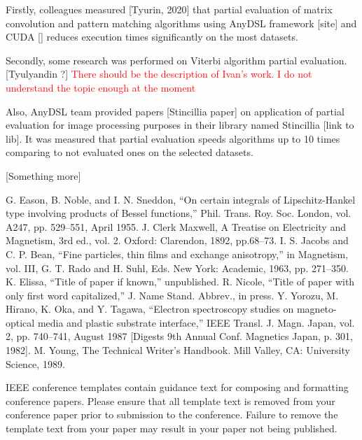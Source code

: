 \documentclass[conference]{IEEEtran}
\begin{document}
Firstly, colleagues measured [Tyurin, 2020] that partial evaluation of matrix convolution and pattern matching algorithms using AnyDSL framework [site] and CUDA [] reduces execution times significantly on the most datasets.

Secondly, some research was performed on Viterbi algorithm partial evaluation. [Tyulyandin ?] \textcolor{red}{There should be the description of Ivan's work. I do not understand the topic enough at the moment}

Also, AnyDSL team provided papers [Stincillia paper] on application of partial evaluation for image processing purposes in their library named Stincillia [link to lib]. It was measured that partial evaluation speeds algorithms up to 10 times comparing to not evaluated ones on the selected datasets.

[Something more]


\begin{thebibliography}{00}
 G. Eason, B. Noble, and I. N. Sneddon, ``On certain integrals of Lipschitz-Hankel type involving products of Bessel functions,'' Phil. Trans. Roy. Soc. London, vol. A247, pp. 529--551, April 1955.
 J. Clerk Maxwell, A Treatise on Electricity and Magnetism, 3rd ed., vol. 2. Oxford: Clarendon, 1892, pp.68--73.
 I. S. Jacobs and C. P. Bean, ``Fine particles, thin films and exchange anisotropy,'' in Magnetism, vol. III, G. T. Rado and H. Suhl, Eds. New York: Academic, 1963, pp. 271--350.
 K. Elissa, ``Title of paper if known,'' unpublished.
 R. Nicole, ``Title of paper with only first word capitalized,'' J. Name Stand. Abbrev., in press.
 Y. Yorozu, M. Hirano, K. Oka, and Y. Tagawa, ``Electron spectroscopy studies on magneto-optical media and plastic substrate interface,'' IEEE Transl. J. Magn. Japan, vol. 2, pp. 740--741, August 1987 [Digests 9th Annual Conf. Magnetics Japan, p. 301, 1982].
 M. Young, The Technical Writer's Handbook. Mill Valley, CA: University Science, 1989.
\end{thebibliography}
\vspace{12pt}
\color{red}
IEEE conference templates contain guidance text for composing and formatting conference papers. Please ensure that all template text is removed from your conference paper prior to submission to the conference. Failure to remove the template text from your paper may result in your paper not being published.
\end{document}
